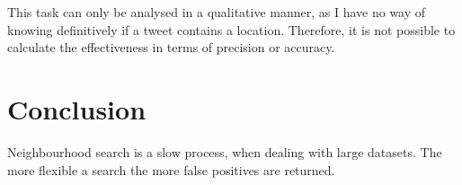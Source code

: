 \documentclass[a4paper]{article}
\begin{document}
This task can only be analysed in a qualitative manner, as I have no way of knowing definitively if a tweet contains a location. Therefore, it is not possible to calculate the effectiveness in terms of precision or accuracy.


\section{Conclusion}
Neighbourhood search is a slow process, when dealing with large datasets.
The more flexible a search the more false positives are returned.
\end{document}
